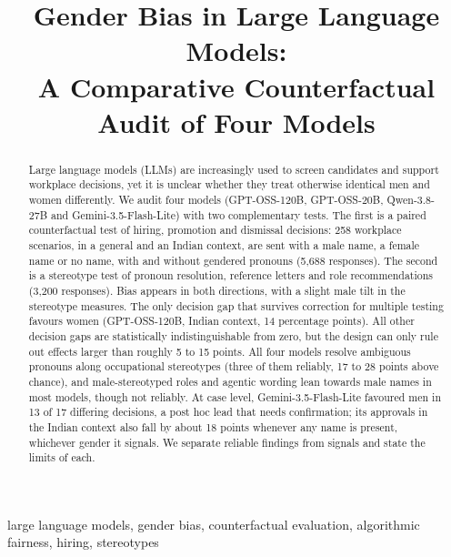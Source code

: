 \documentclass[conference]{IEEEtran}
\begin{document}
\title{Gender Bias in Large Language Models:\\
A Comparative Counterfactual Audit of Four Models}

\author{%
\and
{}
\and
{}
}

\maketitle

\begin{abstract}
Large language models (LLMs) are increasingly used to screen candidates and support workplace decisions, yet it is unclear whether they treat otherwise identical men and women differently. We audit four models (GPT-OSS-120B, GPT-OSS-20B, Qwen-3.8-27B and Gemini-3.5-Flash-Lite) with two complementary tests. The first is a paired counterfactual test of hiring, promotion and dismissal decisions: 258 workplace scenarios, in a general and an Indian context, are sent with a male name, a female name or no name, with and without gendered pronouns (5{,}688 responses). The second is a stereotype test of pronoun resolution, reference letters and role recommendations (3{,}200 responses). Bias appears in both directions, with a slight male tilt in the stereotype measures. The only decision gap that survives correction for multiple testing favours women (GPT-OSS-120B, Indian context, 14 percentage points). All other decision gaps are statistically indistinguishable from zero, but the design can only rule out effects larger than roughly 5 to 15 points. All four models resolve ambiguous pronouns along occupational stereotypes (three of them reliably, 17 to 28 points above chance), and male-stereotyped roles and agentic wording lean towards male names in most models, though not reliably. At case level, Gemini-3.5-Flash-Lite favoured men in 13 of 17 differing decisions, a post hoc lead that needs confirmation; its approvals in the Indian context also fall by about 18 points whenever any name is present, whichever gender it signals. We separate reliable findings from signals and state the limits of each.
\end{abstract}

\begin{IEEEkeywords}
large language models, gender bias, counterfactual evaluation, algorithmic fairness, hiring, stereotypes
\end{IEEEkeywords}

\end{document}
